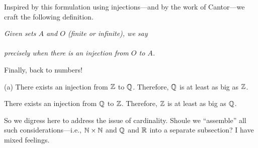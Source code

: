 \medskip

Inspired by this formulation using injections---and by the work of
Cantor---we craft the following definition.

\noindent
{\em
Given sets $A$ and $O$ (finite or infinite), we say \\
\hspace*{.35in}{\em Set $O$ is at least as big as set $A$} \\
precisely when there is an injection from $O$ to $A$.}

\medskip

Finally, back to numbers!


\begin{prop}
\label{thm:|Q|=|Z|}
{\rm (a)} There exists an injection from $\mathbb{Z}$ to $\mathbb{Q}$.  Therefore,
$\mathbb{Q}$ is at least as big as $\mathbb{Z}$.

 There exists an injection from $\mathbb{Q}$ to $\mathbb{Z}$.
Therefore, $\mathbb{Z}$ is at least as big as $\mathbb{Q}$.
\end{prop}

{\Arny So we digress here to address the issue of cardinality.  Shoule
  we ``assemble'' all such considerations---i.e., $\mathbb{N} \times \mathbb{N}$ and
  $\mathbb{Q}$ and $\mathbb{R}$ into a separate subsection?  I have mixed feelings.}

